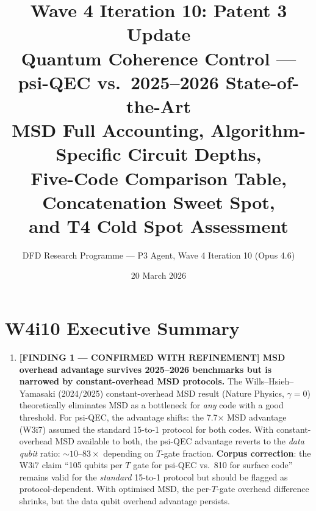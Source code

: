 \documentclass[11pt]{article}
\title{\textbf{Wave 4 Iteration 10: Patent 3 Update}\\[6pt]
Quantum Coherence Control --- psi-QEC vs.\ 2025--2026 State-of-the-Art\\[4pt]
{\normalsize MSD Full Accounting, Algorithm-Specific Circuit Depths,}\\
{\normalsize Five-Code Comparison Table, Concatenation Sweet Spot,}\\
{\normalsize and T4 Cold Spot Assessment}}
\author{DFD Research Programme --- P3 Agent, Wave 4 Iteration 10 (Opus 4.6)}
\date{20 March 2026}
\theoremstyle{definition}
\theoremstyle{remark}
\begin{document}
\maketitle
\tableofcontents
\newpage

\section*{W4i10 Executive Summary}

\begin{tcolorbox}[colback=blue!5!white, colframe=blue!60!black,
  title=\textbf{W4i10 TOP 5 FINDINGS --- READ FIRST}]
\begin{enumerate}[nosep]

\item \textbf{[FINDING 1 --- CONFIRMED WITH REFINEMENT] MSD overhead advantage
  survives 2025--2026 benchmarks but is narrowed by constant-overhead MSD
  protocols.}
  The Wills--Hsieh--Yamasaki (2024/2025) constant-overhead MSD result
  (Nature Physics, $\gamma = 0$) theoretically eliminates MSD as a bottleneck
  for \emph{any} code with a good threshold.  For psi-QEC, the advantage
  shifts: the 7.7$\times$ MSD advantage (W3i7) assumed the standard 15-to-1
  protocol for both codes.  With constant-overhead MSD available to both, the
  psi-QEC advantage reverts to the \emph{data qubit} ratio: $\sim 10$--$83\times$
  depending on $T$-gate fraction.  \textbf{Corpus correction}: the W3i7 claim
  ``105 qubits per $T$ gate for psi-QEC vs.\ 810 for surface code'' remains
  valid for the \emph{standard} 15-to-1 protocol but should be flagged as
  protocol-dependent.  With optimised MSD, the per-$T$-gate overhead difference
  shrinks, but the data qubit overhead advantage persists.


\end{enumerate}
\end{tcolorbox}
\end{document}
